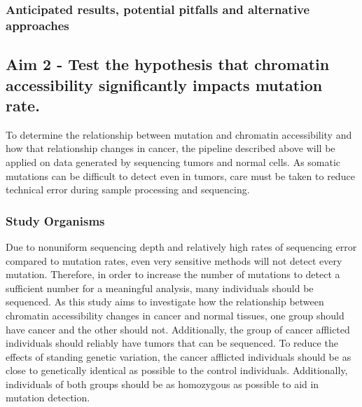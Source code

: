 





\subsubsection{Anticipated results, potential pitfalls and alternative approaches}


\subsection{Aim 2 - Test the hypothesis that chromatin accessibility significantly impacts mutation rate.}
To determine the relationship between mutation and chromatin accessibility and how that relationship changes in cancer, the pipeline described above will be applied on data generated by sequencing tumors and normal cells. As somatic mutations can be difficult to detect even in tumors, care must be taken to reduce technical error during sample processing and sequencing.

\subsubsection{Study Organisms}
Due to nonuniform sequencing depth and relatively high rates of sequencing error compared to mutation rates, even very sensitive methods will not detect every mutation. Therefore, in order to increase the number of mutations to detect a sufficient number for a meaningful analysis, many individuals should be sequenced. As this study aims to investigate how the relationship between chromatin accessibility changes in cancer and normal tissues, one group should have cancer and the other should not.
Additionally, the group of cancer afflicted individuals should reliably have tumors that can be sequenced. To reduce the effects of standing genetic variation, the cancer afflicted individuals should be as close to genetically identical as possible to the control individuals. Additionally, individuals of both groups should be as homozygous as possible to aid in mutation detection.

